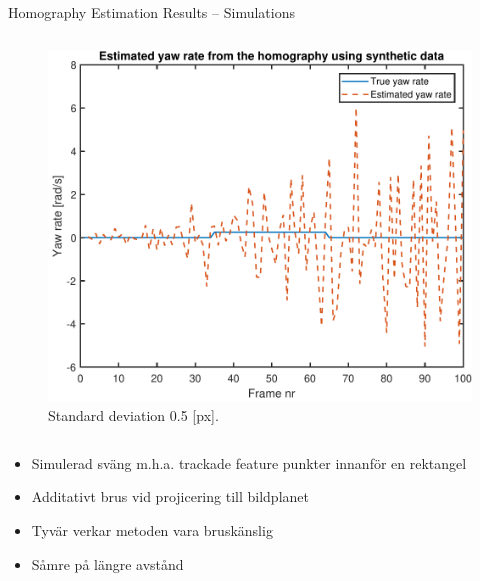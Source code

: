 \documentclass{beamer}
\renewcommand{\a}{\r{a}\xspace}
\renewcommand{\aa}{\"a\xspace}
\renewcommand{\o}{\"o\xspace}
\begin{document}
\begin{frame}{Homography Estimation Results -- Simulations}
\begin{columns}[T]
\begin{figure}
		\includegraphics[height=0.35\textheight]{Hom/rect_5e-1}
		\vspace{-1.25em}
		\caption{Standard deviation 0.5 [px].}
	\end{figure}
	\end{columns}

	\note
	{
		\begin{itemize}
			\item Simulerad sv\aa{}ng m.h.a. trackade feature punkter innanf\o{}r en rektangel
			\vspace{2em}
			\item Additativt brus vid projicering till bildplanet
			\item Tyv\aa{}r verkar metoden vara brusk\aa{}nslig
			\item S\a{}mre p\a{} l\aa{}ngre avst\a{}nd
		\end{itemize}
	}
\end{frame}
\end{document}
